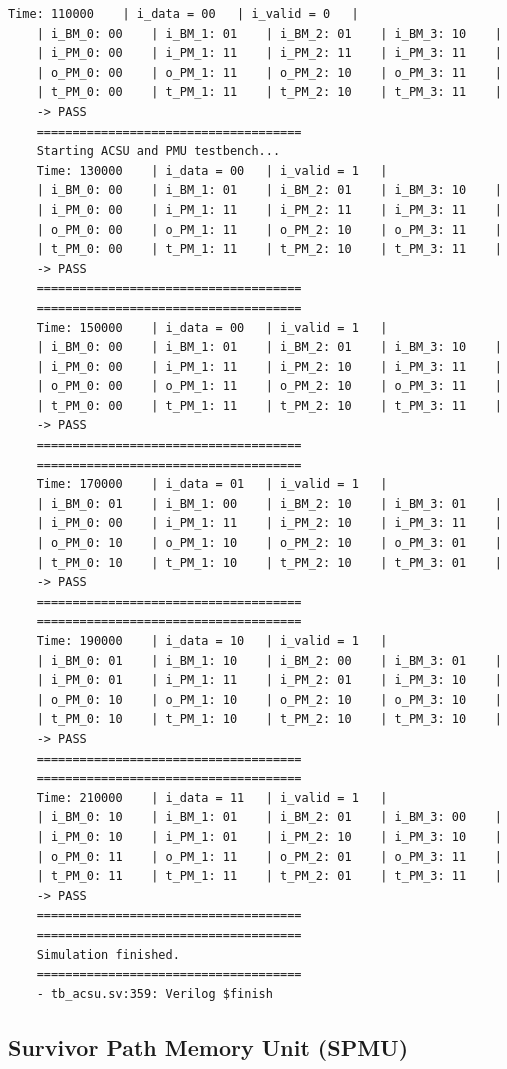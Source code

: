 \begin{lstlisting}[style=StyleResult, language=Result, caption={The Result of testing ACSU.}]
	Time: 110000 	| i_data = 00 	| i_valid = 0 	|
	| i_BM_0: 00 	| i_BM_1: 01 	| i_BM_2: 01 	| i_BM_3: 10 	|
	| i_PM_0: 00 	| i_PM_1: 11 	| i_PM_2: 11 	| i_PM_3: 11 	|
	| o_PM_0: 00 	| o_PM_1: 11 	| o_PM_2: 10 	| o_PM_3: 11 	|
	| t_PM_0: 00 	| t_PM_1: 11 	| t_PM_2: 10 	| t_PM_3: 11 	|
	-> PASS
	=====================================
	Starting ACSU and PMU testbench...
	Time: 130000 	| i_data = 00 	| i_valid = 1 	|
	| i_BM_0: 00 	| i_BM_1: 01 	| i_BM_2: 01 	| i_BM_3: 10 	|
	| i_PM_0: 00 	| i_PM_1: 11 	| i_PM_2: 11 	| i_PM_3: 11 	|
	| o_PM_0: 00 	| o_PM_1: 11 	| o_PM_2: 10 	| o_PM_3: 11 	|
	| t_PM_0: 00 	| t_PM_1: 11 	| t_PM_2: 10 	| t_PM_3: 11 	|
	-> PASS
	=====================================
	=====================================
	Time: 150000 	| i_data = 00 	| i_valid = 1 	|
	| i_BM_0: 00 	| i_BM_1: 01 	| i_BM_2: 01 	| i_BM_3: 10 	|
	| i_PM_0: 00 	| i_PM_1: 11 	| i_PM_2: 10 	| i_PM_3: 11 	|
	| o_PM_0: 00 	| o_PM_1: 11 	| o_PM_2: 10 	| o_PM_3: 11 	|
	| t_PM_0: 00 	| t_PM_1: 11 	| t_PM_2: 10 	| t_PM_3: 11 	|
	-> PASS
	=====================================
	=====================================
	Time: 170000 	| i_data = 01 	| i_valid = 1 	|
	| i_BM_0: 01 	| i_BM_1: 00 	| i_BM_2: 10 	| i_BM_3: 01 	|
	| i_PM_0: 00 	| i_PM_1: 11 	| i_PM_2: 10 	| i_PM_3: 11 	|
	| o_PM_0: 10 	| o_PM_1: 10 	| o_PM_2: 10 	| o_PM_3: 01 	|
	| t_PM_0: 10 	| t_PM_1: 10 	| t_PM_2: 10 	| t_PM_3: 01 	|
	-> PASS
	=====================================
	=====================================
	Time: 190000 	| i_data = 10 	| i_valid = 1 	|
	| i_BM_0: 01 	| i_BM_1: 10 	| i_BM_2: 00 	| i_BM_3: 01 	|
	| i_PM_0: 01 	| i_PM_1: 11 	| i_PM_2: 01 	| i_PM_3: 10 	|
	| o_PM_0: 10 	| o_PM_1: 10 	| o_PM_2: 10 	| o_PM_3: 10 	|
	| t_PM_0: 10 	| t_PM_1: 10 	| t_PM_2: 10 	| t_PM_3: 10 	|
	-> PASS
	=====================================
	=====================================
	Time: 210000 	| i_data = 11 	| i_valid = 1 	|
	| i_BM_0: 10 	| i_BM_1: 01 	| i_BM_2: 01 	| i_BM_3: 00 	|
	| i_PM_0: 10 	| i_PM_1: 01 	| i_PM_2: 10 	| i_PM_3: 10 	|
	| o_PM_0: 11 	| o_PM_1: 11 	| o_PM_2: 01 	| o_PM_3: 11 	|
	| t_PM_0: 11 	| t_PM_1: 11 	| t_PM_2: 01 	| t_PM_3: 11 	|
	-> PASS
	=====================================
	=====================================
	Simulation finished.
	=====================================
	- tb_acsu.sv:359: Verilog $finish
\end{lstlisting}

\subsection{Survivor Path Memory Unit (SPMU)}

